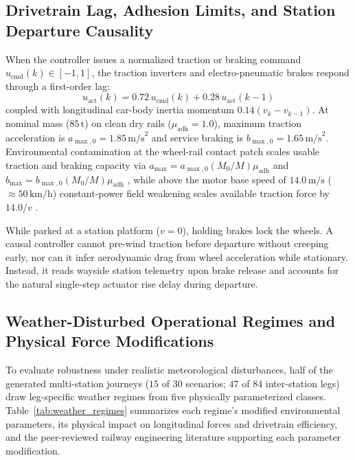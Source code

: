 \documentclass[10pt,a4paper]{article}
\begin{document}
\subsection{Drivetrain Lag, Adhesion Limits, and Station Departure Causality}
When the controller issues a normalized traction or braking command $u_{\text{cmd}}(k) \in [-1, 1]$, the traction inverters and electro-pneumatic brakes respond through a first-order lag:
\begin{equation}
u_{\text{act}}(k) = 0.72\,u_{\text{cmd}}(k) + 0.28\,u_{\text{act}}(k-1)
\label{eq:lag}
\end{equation}
coupled with longitudinal car-body inertia momentum $0.14(v_k - v_{k-1})$. At nominal mass ($85\,\text{t}$) on clean dry rails ($\mu_{\text{adh}} = 1.0$), maximum traction acceleration is $a_{\max,0} = 1.85\,\text{m/s}^2$ and service braking is $b_{\max,0} = 1.65\,\text{m/s}^2$. Environmental contamination at the wheel-rail contact patch scales usable traction and braking capacity via $a_{\max} = a_{\max,0}(M_0/M)\mu_{\text{adh}}$ and $b_{\max} = b_{\max,0}(M_0/M)\mu_{\text{adh}}$ \cite{ref24, ref25}, while above the motor base speed of $14.0\,\text{m/s}$ ($\approx 50\,\text{km/h}$) constant-power field weakening scales available traction force by $14.0 / v$ \cite{ref2}.

While parked at a station platform ($v = 0$), holding brakes lock the wheels. A causal controller cannot pre-wind traction before departure without creeping early, nor can it infer aerodynamic drag from wheel acceleration while stationary. Instead, it reads wayside station telemetry upon brake release and accounts for the natural single-step actuator rise delay during departure.

\subsection{Weather-Disturbed Operational Regimes and Physical Force Modifications}
To evaluate robustness under realistic meteorological disturbances, half of the generated multi-station journeys ($15$ of $30$ scenarios; $47$ of $84$ inter-station legs) draw leg-specific weather regimes from five physically parameterized classes. Table~\ref{tab:weather_regimes} summarizes each regime's modified environmental parameters, its physical impact on longitudinal forces and drivetrain efficiency, and the peer-reviewed railway engineering literature supporting each parameter modification.
\end{document}

